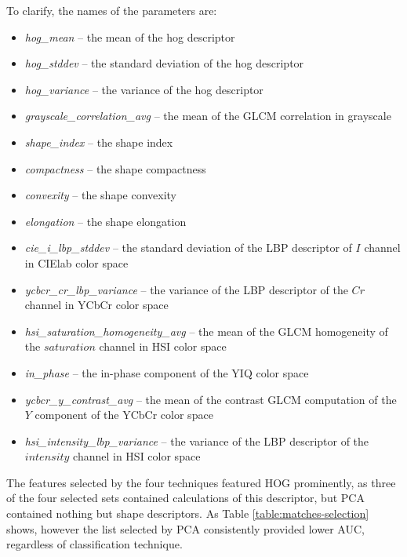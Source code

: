 \documentclass[letterpaper, notitlepage]{report}
\begin{document}
 To clarify, the names of the parameters are:
 \begin{itemize}
 	\item{\textit{hog\_mean} -- the mean of the hog descriptor}
 	\item{\textit{hog\_stddev} -- the standard deviation of the hog descriptor}
 	\item{\textit{hog\_variance} -- the variance of the hog descriptor}
 	\item{\textit{grayscale\_correlation\_avg} -- the mean of the GLCM correlation in grayscale}
 	\item{\textit{shape\_index} -- the shape index}
 	\item{\textit{compactness} -- the shape compactness}
 	\item{\textit{convexity} -- the shape convexity}
 	\item{\textit{elongation} -- the shape elongation}
 	\item{\textit{cie\_i\_lbp\_stddev} -- the standard deviation of the LBP descriptor of $I$ channel in CIElab color space}
 	\item{\textit{ycbcr\_cr\_lbp\_variance} -- the variance of the LBP descriptor of the $Cr$ channel in YCbCr color space}
 	\item{\textit{hsi\_saturation\_homogeneity\_avg} -- the mean of the GLCM homogeneity of the $saturation$ channel in HSI color space}
 	\item{\textit{in\_phase} -- the in-phase component of the YIQ color space}
 	\item{\textit{ycbcr\_y\_contrast\_avg} -- the mean of the contrast GLCM computation of the $Y$ component of the YCbCr color space}
 	\item{\textit{hsi\_intensity\_lbp\_variance} -- the variance of the LBP descriptor of the $intensity$ channel in HSI color space}
 \end{itemize}
 
The features selected by the four techniques featured HOG prominently, as three of the four selected sets contained calculations of this descriptor, but \gls{PCA} contained nothing but shape descriptors. As Table \ref{table:matches-selection} shows, however the list selected by \gls{PCA} consistently provided lower AUC, regardless of classification technique.
 	
\end{document}
